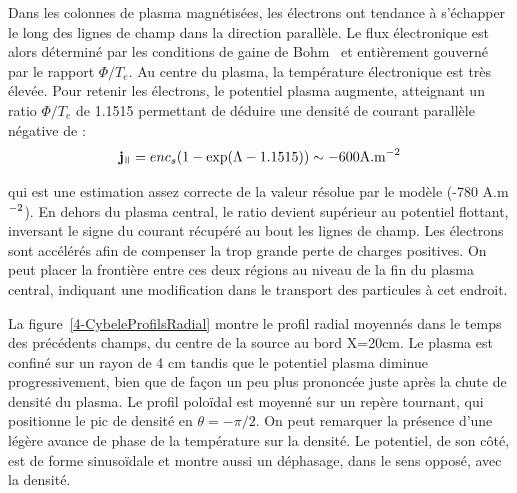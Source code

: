 \begin{refsection}
Dans les colonnes de plasma magnétisées, les électrons ont tendance à s'échapper
le long des lignes de champ dans la direction parallèle. Le flux électronique
est alors déterminé par les conditions de gaine de Bohm~\parencite{Stangeby} et
entièrement gouverné par le rapport $\Phi/T_e$. Au centre du plasma, la
température électronique est très élevée. Pour retenir les électrons, le
potentiel plasma augmente, atteignant un ratio $\Phi/T_e$ de 1.1515 permettant
de déduire une densité de courant parallèle négative de :
\begin{equation}
\mathbf j_\para=enc_s(1-\exp(\Lambda-1.1515))\sim -600\text{A.m}\puissance{-2}
\end{equation}

qui est une estimation assez correcte de la valeur résolue par le modèle (-780
A.m$^{{-2}}$). En dehors du plasma central, le ratio devient supérieur
au potentiel flottant, inversant le signe du courant récupéré au bout les lignes
de champ. Les électrons sont accélérés afin de compenser la trop grande perte de
charges positives. On peut placer la frontière entre ces deux régions au niveau
de la fin du plasma central, indiquant une modification dans le transport des
particules à cet endroit.

La figure~\ref{4-CybeleProfilsRadial} montre le profil radial moyennés dans le
temps des précédents champs, du centre de la source au bord X=20cm. Le plasma
est confiné sur un rayon de 4 cm tandis que le potentiel plasma
diminue progressivement, bien que de façon un peu plus prononcée juste après la
chute de densité du plasma. 
Le profil poloïdal est moyenné sur un repère tournant, qui positionne le pic de
densité en $\theta=-\pi/2$. On peut remarquer la présence d'une légère avance de
phase de la température sur la densité. Le potentiel, de son côté, est de forme
sinusoïdale et montre aussi un déphasage, dans le sens opposé, avec la densité.


\end{refsection}
